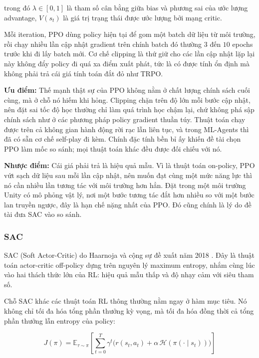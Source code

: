 \noindent trong đó $\lambda \in [0,1]$ là tham số cân bằng giữa bias và phương sai
của ước lượng advantage, $V(s_t)$ là giá trị trạng thái được ước lượng bởi mạng
critic.

\indent Mỗi iteration, PPO dùng policy hiện tại để gom một batch dữ liệu từ môi trường,
rồi chạy nhiều lần cập nhật gradient trên chính batch đó thường $3$ đến $10$ epochs trước
khi đi lấy batch mới. Cơ chế clipping là thứ giữ cho các lần cập nhật lặp lại này không
đẩy policy đi quá xa điểm xuất phát, tức là có được tính ổn định mà không phải trả cái
giá tính toán đắt đỏ như TRPO.

\indent \textbf{Ưu điểm:} Thế mạnh thật sự của PPO không nằm ở chất lượng chính sách cuối
cùng, mà ở chỗ nó hiếm khi hỏng. Clipping chặn trên độ lớn mỗi bước cập nhật, nên đặt sai
tốc độ học thường chỉ làm quá trình học chậm lại, chứ không phá sập chính sách như ở các
phương pháp policy gradient thuần túy. Thuật toán chạy được trên cả không gian hành động
rời rạc lẫn liên tục, và trong ML-Agents thì đã có sẵn cơ chế self-play đi kèm. Chính đặc
tính bền bỉ ấy khiến đề tài chọn PPO làm mốc so sánh; mọi thuật toán khác đều được đối
chiếu với nó.

\indent \textbf{Nhược điểm:} Cái giá phải trả là hiệu quả mẫu. Vì là thuật toán
on-policy, PPO vứt sạch dữ liệu sau mỗi lần cập nhật, nên muốn đạt cùng một mức năng lực
thì nó cần nhiều lần tương tác với môi trường hơn hẳn. Đặt trong một môi trường Unity có
mô phỏng vật lý, nơi một bước tương tác đắt hơn nhiều so với một bước lan truyền ngược,
đây là hạn chế nặng nhất của PPO. Đó cũng chính là lý do đề tài đưa SAC vào so sánh.

\subsubsection{SAC}
\indent SAC (Soft Actor-Critic) do Haarnoja và cộng sự đề xuất năm 2018
\cite{haarnoja2018soft, haarnoja2018softapps}. Đây là thuật toán actor-critic off-policy
dựng trên nguyên lý maximum entropy, nhắm cùng lúc vào hai thách thức lớn của RL: hiệu
quả mẫu thấp và độ nhạy cảm với siêu tham số.

\indent Chỗ SAC khác các thuật toán RL thông thường nằm ngay ở hàm mục tiêu. Nó không chỉ
tối đa hóa tổng phần thưởng kỳ vọng, mà tối đa hóa đồng thời cả tổng phần thưởng lẫn
entropy của policy:

\begin{equation}
    J(\pi) = \mathbb{E}_{\tau \sim \pi} \left[
        \sum_{t=0}^{T} \gamma^t \Big( r(s_t, a_t) +
        \alpha \, \mathcal{H}\!\left(\pi(\cdot \mid s_t)\right) \Big)
    \right]
\end{equation}

